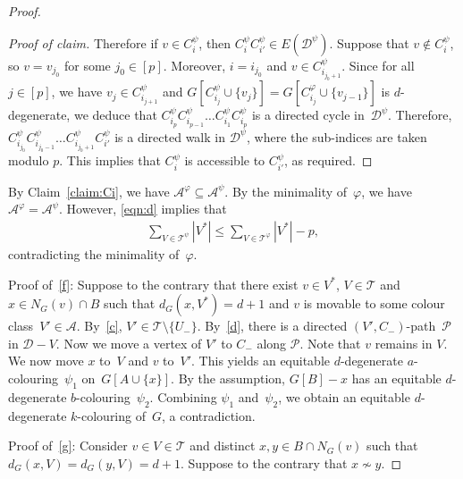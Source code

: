 \documentclass[11pt]{article}
\newenvironment{proofclaim}[1][Proof of claim]{\begin{proof}[#1]\renewcommand*{\qedsymbol}{\(\blacksquare\)}}{\end{proof}}
\theoremstyle{plain}
\numberwithin{equation}{section}
\begin{document}
\begin{proof}
\begin{proofclaim}
		
Therefore if $ v \in C_i^\psi$, then $C_i^\psi C_{i'}^\psi \in E(\mathcal{D}^\psi)$.
Suppose that $v \notin C_i^\psi$, so $v = v_{j_0}$ for some $j_0 \in [p]$.
Moreover, $i = i_{j_0}$ and $v \in C^{\psi}_{i_{j_0+1}}$.
Since for all $j \in [p]$, we have $v_j\in C_{i_{j+1}}^\psi$ and $G[C_{i_j}^{\psi} \cup \{v_j\}] = G[C_{i_j}^{\varphi} \cup \{v_{j-1}\}]$ is $d$-degenerate, we deduce that $C^{\psi}_{i_p}C^{\psi}_{i_{p-1}}\ldots C^{\psi}_{i_1}C^{\psi}_{i_p}$ is a directed cycle in~$\mathcal{D}^{\psi}$.
Therefore, $C_{i_{j_0}}^{\psi} C_{i_{j_0-1}}^\psi \ldots C_{i_{{j_0+1}}}^{\psi} C_{i'}^\psi$ is a directed walk in $\mathcal{D}^\psi$, where the sub-indices are taken modulo $p$.
This implies that $C_{i}^\psi$ is accessible to $C_{i'}^\psi$, as required.
    \end{proofclaim}

By Claim~\ref{claim:Ci}, we have  $\mathcal{A}^\varphi \subseteq \mathcal{A}^\psi $.
By the minimality of~$\varphi$, we have $\mathcal{A}^\varphi = \mathcal{A}^\psi $.
However, \eqref{eqn:d} implies that
\begin{align*}
	\sum_{V \in \mathcal{T}^\psi}|V^*| \leq \sum_{ V \in \mathcal{T}^\varphi}|V^*|-p,
\end{align*}
contradicting the minimality of~$\varphi$.
	




	Proof of~\ref{f}: Suppose to the contrary that there exist $v \in V^*$, $V \in \mathcal{T}$ and $x \in N_G(v) \cap B$ such that $d_G(x,V^*) =d+1$ and $v$ is movable to some colour class~$V' \in \mathcal{A}$.
	By~\ref{c}, $V' \in \mathcal{T} \setminus \{U_-\}$.
	By~\ref{d}, there is a directed $(V',C_-)$-path~$\mathcal{P}$ in $\mathcal{D}-V$.
	Now we move a vertex of $V'$ to $C_-$ along $\mathcal{P}$.
	Note that $v$ remains in $V$.
	We now move $x$ to~$V$ and $v$ to~$V'$.
	This yields an equitable $d$-degenerate $a$-colouring~$\psi_1$ on~$G[A \cup \{x\}]$.
	By the assumption, $G[B]-x$ has an equitable $d$-degenerate $b$-colouring~$\psi_2$.
	Combining $\psi_1$ and~$\psi_2$, we obtain an equitable $d$-degenerate $k$-colouring of~$G$, a contradiction.
	
	Proof of~\ref{g}:
	Consider $ v \in V \in \mathcal{T}$ and distinct $x,y \in B\cap N_{G}(v)$ such that
$d_G(x,V)  = d_G(y,V) =d+1$.
    Suppose to the contrary that $x\not\sim y$.


\end{proof}
\end{document}
